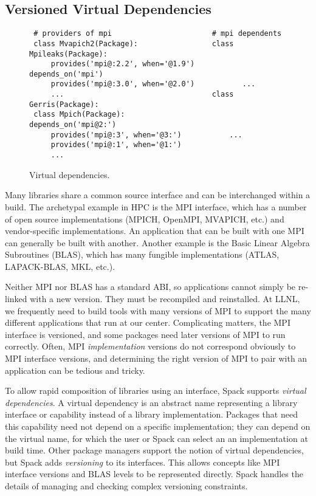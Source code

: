 
\subsection{Versioned Virtual Dependencies}\label{sec:virtual}

\begin{figure}
	\begin{verbatim}
 # providers of mpi                       # mpi dependents
 class Mvapich2(Package):                 class Mpileaks(Package):
     provides('mpi@:2.2', when='@1.9')        depends_on('mpi')
     provides('mpi@:3.0', when='@2.0')           ...
     ...                                  class Gerris(Package):
 class Mpich(Package):                        depends_on('mpi@2:')
     provides('mpi@:3', when='@3:')           ...
     provides('mpi@:1', when='@1:')
     ...
\end{verbatim}
\caption{
	Virtual dependencies.
	\label{fig:virtual-deps}
}
\end{figure}

Many libraries share a common source interface and can be interchanged
within a build.
The archetypal example in HPC is the MPI interface, which has a number of
open source implementations (MPICH, OpenMPI, MVAPICH, etc.) and vendor-specific
implementations. An application that can be built with one MPI can generally be
built with another.  Another example is the Basic Linear Algebra
Subroutines (BLAS), which has many fungible implementations
(ATLAS, LAPACK-BLAS, MKL, etc.).

Neither MPI nor BLAS has a standard ABI, so applications cannot simply be
re-linked with a new version. They must be recompiled and reinstalled.
At LLNL, we frequently need to build tools with many versions of MPI to support
the many different applications that run at our center.
Complicating matters, the MPI interface is versioned, and some
packages need later versions of MPI to run correctly.  Often, MPI
{\it implementation} versions do not correspond obviously to MPI
interface versions, and determining the right version of
MPI to pair with an application can be tedious and tricky.

To allow rapid composition of libraries using an interface, Spack supports
{\it virtual dependencies}.  A virtual dependency is an abstract name
representing a library interface or capability instead of a library
implementation.  Packages that need this capability need not depend on
a specific implementation; they can depend on the virtual name, for which
the user or Spack can select an an implementation at build time.
Other package managers support the notion of virtual dependencies, but Spack
adds {\it versioning} to its interfaces.  This allows concepts like MPI
interface versions and BLAS levels to be represented directly.  Spack
handles the details of managing and checking complex versioning constraints.

